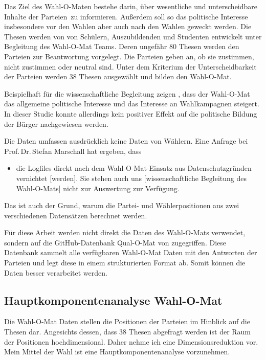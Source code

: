 Das Ziel des Wahl-O-Maten bestehe darin, über \glqq wesentliche und unterscheidbare Inhalte der Parteien\grqq\ zu informieren. Außerdem soll so das politische Interesse insbesondere vor den Wahlen aber auch nach den Wahlen geweckt werden. 
Die Thesen werden von von Schülern, Auszubildenden und Studenten entwickelt unter Begleitung des Wahl-O-Mat Teams. Deren ungefähr 80 Thesen werden den Parteien zur Beantwortung vorgelegt. Die Parteien geben an, ob sie zustimmen, nicht zustimmen oder neutral sind. Unter dem Kriterium der Unterscheidbarkeit der Parteien werden  38 Thesen ausgewählt und bilden den Wahl-O-Mat.
\citep{marschall2022wahlomatFAQ}%

Beispielhaft für die wissenschaftliche Begleitung zeigen \citet{heinsohn2019effects}, dass der Wahl-O-Mat das allgemeine politische Interesse und das Interesse an Wahlkampagnen steigert. In dieser Studie konnte allerdings kein positiver Effekt auf die politische Bildung der Bürger nachgewiesen werden. \citep[S.\,257-258]{heinsohn2019effects}

Die Daten umfassen ausdrücklich keine Daten von Wählern. Eine Anfrage bei Prof.\,Dr.\,Stefan Marschall hat ergeben, dass
\begin{itemize}
	\item[] \glqq die Logfiles direkt nach dem Wahl-O-Mat-Einsatz aus Datenschutzgründen vernichtet [werden]. Sie stehen auch uns [wissenschaftliche Begleitung des Wahl-O-Mats] nicht zur Auswertung zur Verfügung.\grqq
\end{itemize}
Das ist auch der Grund, warum die Partei- und Wählerpositionen aus zwei verschiedenen Datensätzen berechnet werden.

Für diese Arbeit werden nicht direkt die Daten des Wahl-O-Mats verwendet, sondern auf die GitHub-Datenbank Qual-O-Mat von \citet{Bolte2022QualOMat} zugegriffen. Diese Datenbank sammelt alle verfügbaren Wahl-O-Mat Daten mit den Antworten der Parteien und legt diese in einem strukturierten Format ab.
Somit können die Daten besser verarbeitet werden.

\subsection{Hauptkomponentenanalyse Wahl-O-Mat}

Die Wahl-O-Mat Daten stellen die Positionen der Parteien im Hinblick auf die Thesen dar. Angesichts dessen, dass 38 Thesen abgefragt werden ist der Raum der Positionen hochdimensional. Daher nehme ich eine Dimensionsreduktion vor. Mein Mittel der Wahl ist eine Hauptkomponentenanalyse vorzunehmen.

